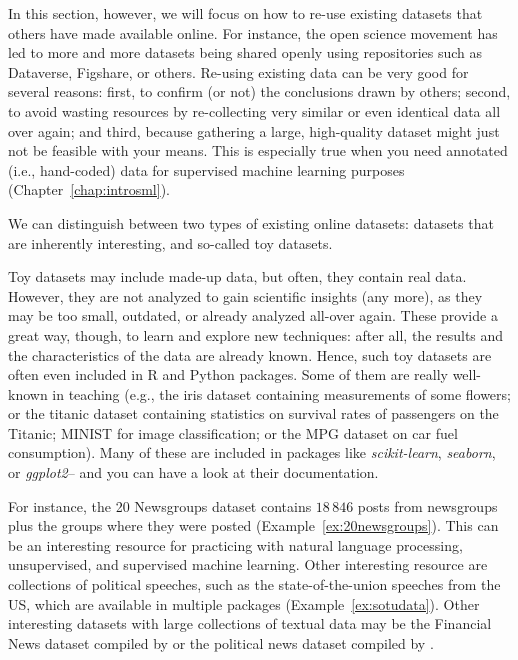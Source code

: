 In this section, however, we will focus on how to re-use existing
datasets that others have made available online. For instance, the
open science movement has led to more and more datasets being shared
openly using repositories such as Dataverse, Figshare, or
others. Re-using existing data can be very good for several reasons:
first, to confirm (or not) the conclusions drawn by others; second, to
avoid wasting resources by re-collecting very similar or even identical
data all over again; and third, because gathering a large,
high-quality dataset might just not be feasible with your means. This
is especially true when you need annotated (i.e., hand-coded) data for
supervised machine learning purposes (Chapter~\ref{chap:introsml}).

We can distinguish between two types of existing online datasets:
datasets that are inherently interesting, and so-called toy datasets.

Toy datasets may include made-up data, but often, they contain real data. 
However, they are not analyzed to gain scientific insights (any
more), as they may be too small, outdated, or already analyzed
all-over again. These provide a great way, though, to learn and
explore new techniques: after all, the results and the characteristics
of the data are already known. Hence, such toy datasets are often
even included in R and Python packages. Some of them are really
well-known in teaching (e.g., the iris dataset containing measurements
of some flowers; or the titanic dataset containing statistics on
survival rates of passengers on the Titanic; MINIST for image classification; or the MPG dataset on car fuel consumption). Many of these are included
in packages like \emph{scikit-learn}, \emph{seaborn}, or \emph{ggplot2}-- and you can have a look at their documentation.

For instance, the 20 Newsgroups dataset contains $18\,846$ posts from
newsgroups plus the groups where they were posted
(Example~\ref{ex:20newsgroups}). This can be an interesting resource for
practicing  with natural language processing, unsupervised, and
supervised machine learning. Other interesting resource are
collections of political speeches, such as the state-of-the-union
speeches from the US, which are available in multiple packages
(Example~\ref{ex:sotudata}).
Other interesting datasets with large collections of textual data may
be the Financial News dataset compiled by \cite{Chen2017} or the
political news dataset compiled by \cite{Horne2018}.


